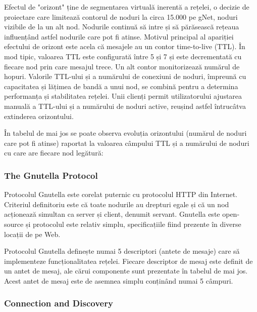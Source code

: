 Efectul de "orizont" ține de segmentarea virtuală inerentă a rețelei, o
decizie de proiectare care limitează contorul de noduri la circa 15.000 pe
gNet, noduri vizibile de la un alt nod. Nodurile continuă să intre și să
părăsească rețeaua influențând astfel nodurile care pot fi atinse. Motivul
principal al apariției efectului de orizont este acela că mesajele au un
contor time-to-live (TTL). În mod tipic, valoarea TTL este configurată între 5
și 7 și este decrementată cu fiecare nod prin care mesajul trece. Un alt
contor monitorizează numărul de hopuri. Valorile TTL-ului și a numărului de
conexiuni de noduri, împreună cu capacitatea și lățimea de bandă a unui nod,
se combină pentru a determina performanța și stabilitatea rețelei. Unii
clienți permit utilizatorului ajustarea manuală a TTL-ului și a numărului de
noduri active, reușind astfel întrucâtva extinderea orizontului.

În tabelul de mai jos se poate observa evoluția orizontului (numărul de noduri
care pot fi atinse) raportat la valoarea câmpului TTL și a numărului de noduri
cu care are fiecare nod legătură:



\subsubsection{The Gnutella Protocol}

Protocolul Gnutella este corelat puternic cu protocolul HTTP din Internet.
Criteriul definitoriu este că toate nodurile au drepturi egale și că un nod
acționează simultan ca server și client, denumit servant. Gnutella este
open-source și protocolul este relativ simplu, specificațiile fiind prezente
în diverse locații de pe Web.

Protocolul Gnutella definește numai 5 descriptori (antete de mesaje) care să
implementeze funcționalitatea rețelei. Fiecare descriptor de mesaj este
definit de un antet de mesaj, ale cărui componente sunt prezentate în tabelul
de mai jos. Acest antet de mesaj este de asemnea simplu conținând numai 5
câmpuri.

\subsubsection{Connection and Discovery}

